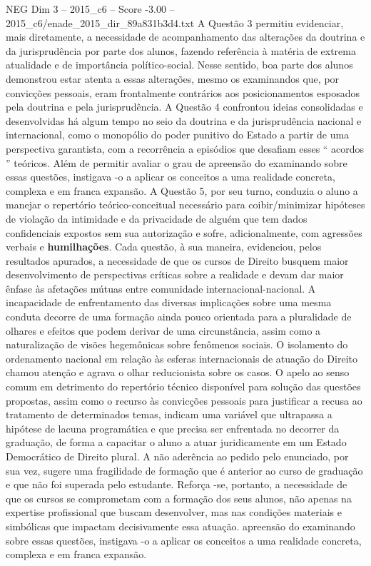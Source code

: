 \begin{textsample}{NEG Dim 3 – 2015\_c6 – Score -3.00 – 2015\_c6/enade\_2015\_dir\_89a831b3d4.txt}
A Questão 3 permitiu evidenciar, mais diretamente, a necessidade de acompanhamento das alterações da doutrina e da jurisprudência por parte dos alunos, fazendo referência à matéria de extrema atualidade e de importância político-social.
Nesse sentido, boa parte dos alunos demonstrou estar atenta a essas alterações, mesmo os examinandos que, por convicções pessoais, eram frontalmente contrários aos posicionamentos esposados pela doutrina e pela jurisprudência.
A Questão 4 confrontou ideias consolidadas e desenvolvidas há algum tempo no seio da doutrina e da jurisprudência nacional e internacional, como o monopólio do poder punitivo do Estado a partir de uma perspectiva garantista, com a recorrência a episódios que desafiam esses “ acordos ” teóricos.
Além de permitir avaliar o grau de apreensão do examinando sobre essas questões, instigava -o a aplicar os conceitos a uma realidade concreta, complexa e em franca expansão.
A Questão 5, por seu turno, conduzia o aluno a manejar o repertório teórico-conceitual necessário para coibir/minimizar hipóteses de violação da intimidade e da privacidade de alguém que tem dados confidenciais expostos sem sua autorização e sofre, adicionalmente, com agressões verbais e \textbf{humilhações}.
Cada questão, à sua maneira, evidenciou, pelos resultados apurados, a necessidade de que os cursos de Direito busquem maior desenvolvimento de perspectivas críticas sobre a realidade e devam dar maior ênfase às afetações mútuas entre comunidade internacional-nacional.
A incapacidade de enfrentamento das diversas implicações sobre uma mesma conduta decorre de uma formação ainda pouco orientada para a pluralidade de olhares e efeitos que podem derivar de uma circunstância, assim como a naturalização de visões hegemônicas sobre fenômenos sociais.
O isolamento do ordenamento nacional em relação às esferas internacionais de atuação do Direito chamou atenção e agrava o olhar reducionista sobre os casos.
O apelo ao senso comum em detrimento do repertório técnico disponível para solução das questões propostas, assim como o recurso às convicções pessoais para justificar a recusa ao tratamento de determinados temas, indicam uma variável que ultrapassa a hipótese de lacuna programática e que precisa ser enfrentada no decorrer da graduação, de forma a capacitar o aluno a atuar juridicamente em um Estado Democrático de Direito plural.
A não aderência ao pedido pelo enunciado, por sua vez, sugere uma fragilidade de formação que é anterior ao curso de graduação e que não foi superada pelo estudante.
Reforça -se, portanto, a necessidade de que os cursos se comprometam com a formação dos seus alunos, não apenas na expertise profissional que buscam desenvolver, mas nas condições materiais e simbólicas que impactam decisivamente essa atuação. apreensão do examinando sobre essas questões, instigava -o a aplicar os conceitos a uma realidade concreta, complexa e em franca expansão.

\end{textsample}
